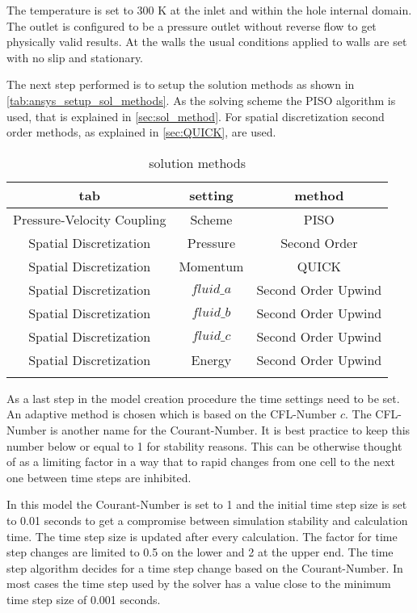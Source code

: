 \documentclass[../thesis.tex]{subfiles}
\begin{document}
The temperature is set to 300 K at the inlet and within the hole internal domain. The outlet is configured to be a pressure outlet without reverse flow to get physically valid results. At the walls the usual conditions applied to walls are set with no slip and stationary.

The next step performed is to setup the solution methods as shown in \autoref{tab:ansys_setup_sol_methods}. As the solving scheme the PISO algorithm is used, that is explained in \autoref{sec:sol_method}. For spatial discretization second order methods, as explained in \autoref{sec:QUICK}, are used. 
\begin{table} [htb]
	\centering
	\caption{solution methods}
	\begin{tabular}{ ccc }
		\hline
		tab & setting & method \\
		\hline
		Pressure-Velocity Coupling & Scheme & PISO \\
		Spatial Discretization & Pressure & Second Order \\
		Spatial Discretization & Momentum & QUICK \\
		Spatial Discretization & $fluid\_a$ & Second Order Upwind \\
		Spatial Discretization & $fluid\_b$ & Second Order Upwind \\
		Spatial Discretization & $fluid\_c$ & Second Order Upwind \\
		Spatial Discretization & Energy & Second Order Upwind \\
		\hline		
		\label{tab:ansys_setup_sol_methods}
	\end{tabular}
\end{table}

As a last step in the model creation procedure the time settings need to be set. An adaptive method is chosen which is based on the CFL-Number $c$. The CFL-Number is another name for the Courant-Number. It is best practice to keep this number below or equal to 1 for stability reasons. This can be otherwise thought of as a limiting factor in a way that to rapid changes from one cell to the next one between time steps are inhibited.
  
In this model the Courant-Number is set to 1 and the initial time step size is set to 0.01 seconds to get a compromise between simulation stability and calculation time. The time step size is updated after every calculation. The factor for time step changes are limited to 0.5 on the lower and 2 at the upper end. The time step algorithm decides for a time step change based on the Courant-Number. In most cases the time step used by the solver has a value close to the minimum time step size of 0.001 seconds. 
\end{document}
